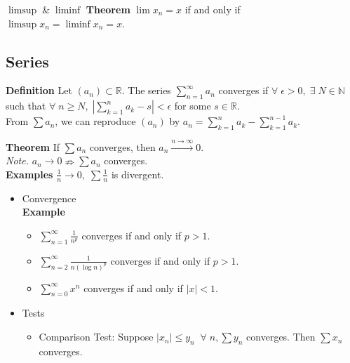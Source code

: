 \documentclass[12pt]{article}
\begin{document}
\begin{section}{\bf $\limsup\;\&\;\liminf$}
    \vspace{1\baselineskip}
    {\bf Theorem} $\lim x_n=x$ if and only if $\limsup x_n = \liminf x_n = x$.

\section{Series}
{\bf Definition} Let $(a_n)\subset\mathbb{R}$. The series $\sum\limits_{n=1}^\infty a_n$ converges if $\forall\;\epsilon>0,\;\exists\;N\in\mathbb{N}$ such that $\forall\; n\ge N,\;\left|\sum\limits_{k=1}^n a_k - s\right|<\epsilon$ for some $s\in \mathbb{R}$.\\
    
    From $\sum a_n$, we can reproduce $(a_n)$ by $a_n = \sum\limits_{k=1}^n a_k - \sum\limits_{k=1}^{n-1} a_k$.
    
    \vspace{1\baselineskip}
    {\bf Theorem} If $\sum a_n$ converges, then $a_n\xrightarrow{n\to\infty} 0$.\\
    
    {\sl Note.} $a_n\to 0 \nRightarrow \sum a_n$ converges.\\
    
    {\bf Examples} $\frac{1}{n}\to 0,\;\sum \frac{1}{n}$ is divergent.
    
    
    \begin{itemize}
        \item Convergence\\
        
        {\bf Example}
        \begin{itemize}
            \item $\sum\limits_{n=1}^\infty \frac{1}{n^p}$ converges if and only if $p>1$.
            \item $\sum\limits_{n=2}^\infty \frac{1}{n(\log n)^p}$ converges if and only if $p>1$.
            \item $\sum\limits_{n=0}^\infty x^n$ converges if and only if $|x|<1$.
        \end{itemize}
        
        \item Tests
        \begin{itemize}
            \item Comparison Test: Suppose $|x_n|\le y_n\;\;\forall\;n, \sum y_n$ converges. Then $\sum x_n$ converges.\\
            

\end{itemize}
\end{itemize}
\end{section}
\end{document}

